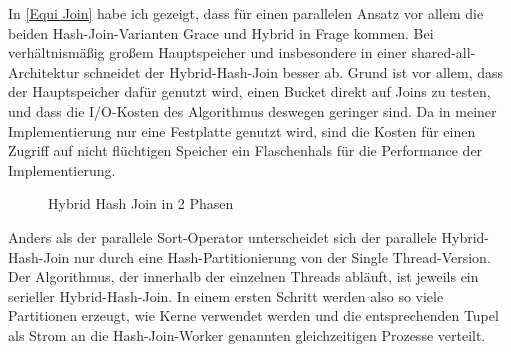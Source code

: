 \documentclass[a4paper,12pt,twoside]{article}
\begin{document}
In \autoref{Equi Join} habe ich gezeigt, dass für einen parallelen Ansatz vor allem die beiden Hash-Join-Varianten Grace und Hybrid in Frage kommen. Bei verhältnismäßig großem Hauptspeicher und insbesondere in einer shared-all-Architektur schneidet der Hybrid-Hash-Join besser ab. Grund ist vor allem, dass der Hauptspeicher dafür genutzt wird, einen Bucket direkt auf Joins zu testen, und dass die I/O-Kosten des Algorithmus deswegen geringer sind. Da in meiner Implementierung nur eine Festplatte genutzt wird, sind die Kosten für einen Zugriff auf nicht flüchtigen Speicher ein Flaschenhals für die Performance der Implementierung.

\begin{figure}
	\centering
	\qquad
	\caption{Hybrid Hash Join in 2 Phasen \autocite{Richly2009}}
	\label{img:hybrid}
\end{figure}

Anders als der parallele Sort-Operator unterscheidet sich der parallele Hybrid-Hash-Join nur durch eine Hash-Partitionierung von der Single Thread-Version. Der Algorithmus, der innerhalb der einzelnen Threads abläuft, ist jeweils ein serieller Hybrid-Hash-Join. In einem ersten Schritt werden also so viele Partitionen erzeugt, wie Kerne verwendet werden und die entsprechenden Tupel als Strom an die Hash-Join-Worker genannten gleichzeitigen Prozesse verteilt.
\end{document}
